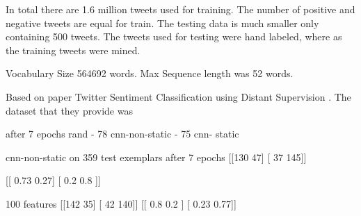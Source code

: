 \documentclass[12pt]{article}
\begin{document}
In total there are 1.6 million tweets used for training. The number of positive and negative tweets are equal for train. The testing data is much smaller only containing 500 tweets. The tweets used for testing were hand labeled, where as the training tweets were mined.

Vocabulary Size 564692 words.
Max Sequence length was 52 words.

Based on paper Twitter Sentiment Classification using Distant Supervision \cite{Go_Bhayani_Huang_2009}. The dataset that they provide was

after 7 epochs
rand - 78 %
cnn-non-static - 75 %
cnn- static

cnn-non-static on 359 test exemplars after 7 epochs
[[130  47]
[ 37 145]]

[[ 0.73  0.27]
[ 0.2   0.8 ]]

100 features
[[142  35]
[ 42 140]]
[[ 0.8   0.2 ]
[ 0.23  0.77]]


\newpage


\end{document}

